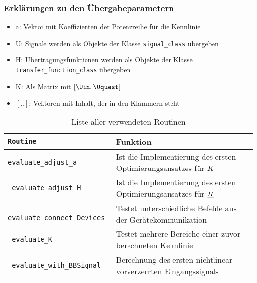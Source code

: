 \documentclass[../Report.tex]{subfiles}
\begin{document}
\subsubsection{Erklärungen zu den Übergabeparametern}
\begin{itemize}
	\item a: Vektor mit Koeffizienten der Potenzreihe für die Kennlinie
	\item U: Signale werden als Objekte der Klasse \texttt{signal\_class} übergeben
	\item H: Übertragungsfunktionen werden als Objekte der Klasse \texttt{transfer\_function\_class} übergeben
	\item K: Als Matrix mit $[\Uin, \Uquest]$
	\item $[..]$: Vektoren mit Inhalt, der in den Klammern steht
\end{itemize}
\begin{table}[H]
\centering 
\begin{tabular}[t]{| >{\texttt\bgroup}m{6cm}<{\egroup}|m{8cm}|} 
  \hline
    \textrm{\textbf{Routine}} & \textbf{Funktion} \\ 
  \hline \hline
  evaluate\_adjust\_a & Ist die Implementierung des ersten Optimierungsansatzes für $K$ \\
  \hline
  evaluate\_adjust\_H & Ist die Implementierung des ersten Optimierungsansatzes für $\underline{H}$ \\
  \hline 
  evaluate\_connect\_Devices & Testet unterschiedliche Befehle aus der Gerätekommunikation \\
  \hline
  evaluate\_K & Testet mehrere Bereiche einer zuvor berechneten Kennlinie \\
  \hline
  evaluate\_with\_BBSignal & Berechnung des ersten nichtlinear vorverzerrten Eingangssignals \\
  \hline
\end{tabular}
\caption{Liste aller verwendeten Routinen}
\label{tab:anhang.Funktionen.routine}
\end{table}
\end{document}
